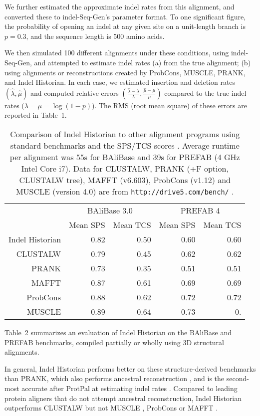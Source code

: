\documentclass{bioinfo}
\begin{document}
We further estimated the approximate indel rates from this alignment, and converted these to indel-Seq-Gen's parameter format.
To one significant figure, the probability of opening an indel at any given site on a unit-length branch is $p=0.3$, and the sequence length is 500 amino acids.

We then simulated 100 different alignments under these conditions, using indel-Seq-Gen, and attempted to estimate indel rates
(a) from the true alignment; (b) using alignments or reconstructions created by ProbCons, MUSCLE, PRANK, and Indel Historian.
In each case, we estimated insertion and deletion rates $(\hat{\lambda},\hat{\mu})$ and computed relative errors $(\frac{\hat{\lambda}-\lambda}{\lambda},\frac{\hat{\mu}-\mu}{\mu})$
compared to the true indel rates ($\lambda = \mu = \log(1-p)$).
The RMS (root mean square) of these errors are reported in Table~1.

\begin{table}
  \begin{tabular}{r|rr|rr}
    & \multicolumn{2}{c|}{BAliBase 3.0} & \multicolumn{2}{c}{PREFAB 4} \\
    & Mean SPS & Mean TCS & Mean SPS & Mean TCS \\
    \hline
Indel Historian & 0.82 & 0.50 & 0.60 & 0.60 \\
CLUSTALW & 0.79 & 0.45 & 0.62 & 0.62 \\
PRANK & 0.73 & 0.35 & 0.51 & 0.51 \\
MAFFT & 0.87 & 0.61 & 0.69 & 0.69 \\
ProbCons & 0.88 & 0.62 & 0.72 & 0.72 \\
MUSCLE & 0.89 & 0.64 & 0.73 & 0.\end{tabular}
  \caption{
    Comparison of Indel Historian to other alignment programs using standard benchmarks
    and the SPS/TCS scores \citep{ThompsonEtAl2005}.
    Average runtime per alignment was 55s for BAliBase and 39s for PREFAB (4 GHz Intel Core i7).
    Data for CLUSTALW, PRANK (+F option, CLUSTALW tree), MAFFT (v6.603), ProbCons (v1.12) and MUSCLE (version 4.0) are from {\tt http://drive5.com/bench/} \citep{Edgar2010}.
  }
\end{table}

Table~2 summarizes an evaluation of Indel Historian
on the BAliBase and PREFAB benchmarks,
compiled partially or wholly using 3D structural alignments.

In general, Indel Historian performs better on these structure-derived benchmarks than PRANK,
which also performs ancestral reconstruction \citep{LoytynojaGoldman2008},
and is the second-most accurate after ProtPal at estimating indel rates \citep{Westesson2012-zg}.
Compared to leading protein aligners that do not attempt ancestral reconstruction,
Indel Historian outperforms CLUSTALW \citep{LarkinEtAl2007} but not MUSCLE \citep{Edgar2004b},
ProbCons \citep{DoEtAl2005} or MAFFT \citep{KatohEtAl2005}.
\end{document}
